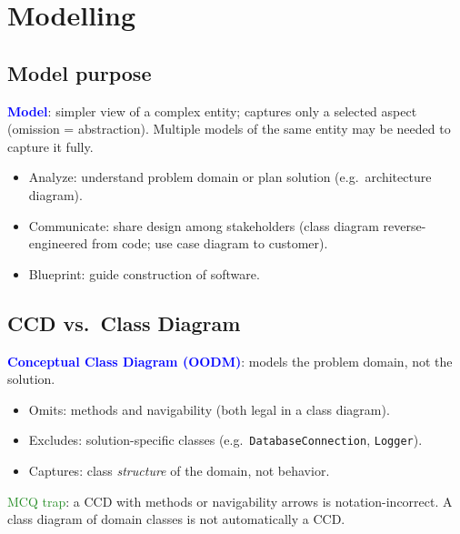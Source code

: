 \section{Modelling}

\subsection{Model purpose}
\textcolor{Blue}{\textbf{Model}}: simpler view of a complex entity; captures only a selected aspect (omission = abstraction). Multiple models of the same entity may be needed to capture it fully.
\begin{itemize}
  \item \textcolor{Bittersweet}{Analyze}: understand problem domain or plan solution (e.g.\ architecture diagram).
  \item \textcolor{Bittersweet}{Communicate}: share design among stakeholders (class diagram reverse-engineered from code; use case diagram to customer).
  \item \textcolor{Bittersweet}{Blueprint}: guide construction of software.
\end{itemize}

\subsection{CCD vs.\ Class Diagram}
\textcolor{Blue}{\textbf{Conceptual Class Diagram (OODM)}}: models the problem domain, not the solution.
\begin{itemize}
  \item \textcolor{Bittersweet}{Omits}: methods and navigability (both legal in a class diagram).
  \item \textcolor{Bittersweet}{Excludes}: solution-specific classes (e.g.\ \texttt{DatabaseConnection}, \texttt{Logger}).
  \item \textcolor{Bittersweet}{Captures}: class \emph{structure} of the domain, not behavior.
\end{itemize}
\textcolor{ForestGreen}{MCQ trap}: a CCD with methods or navigability arrows is notation-incorrect. A class diagram of domain classes is not automatically a CCD.

